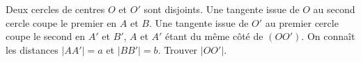Deux cercles de centres $O$ et $O'$ sont disjoints. Une tangente issue de $O$ au second cercle coupe le premier en $A$ et $B$. Une tangente issue de $O'$ au premier cercle coupe le second en $A'$ et $B'$, $A$ et $A'$ étant du même côté de $(OO')$. On connaît les distances $|AA'| = a$ et $|BB'| = b$. Trouver $|OO'|$.
